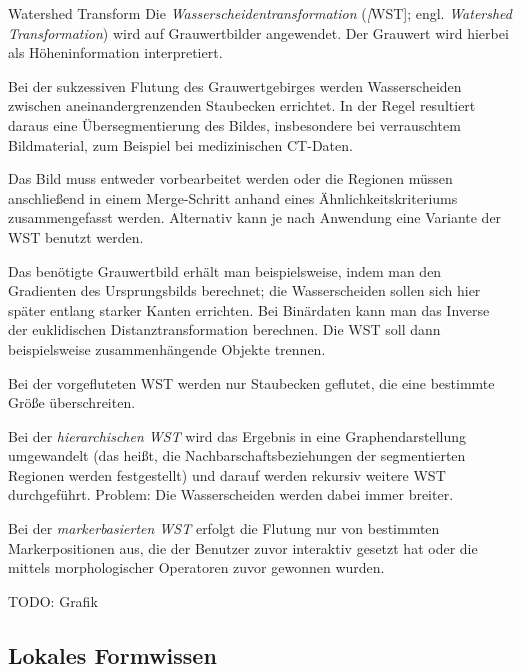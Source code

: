 \begin{defi}{Watershed Transform}
    Die \emph{Wasserscheidentransformation} (\emph[WST]; engl. \emph{Watershed Transformation}) wird auf Grauwertbilder angewendet.
    Der Grauwert wird hierbei als Höheninformation interpretiert.

    Bei der sukzessiven Flutung des Grauwertgebirges werden Wasserscheiden zwischen aneinandergrenzenden Staubecken errichtet.
    In der Regel resultiert daraus eine Übersegmentierung des Bildes, insbesondere bei verrauschtem Bildmaterial, zum Beispiel bei medizinischen CT-Daten.

    Das Bild muss entweder vorbearbeitet werden oder die Regionen müssen anschließend in einem Merge-Schritt anhand eines Ähnlichkeitskriteriums zusammengefasst werden.
    Alternativ kann je nach Anwendung eine Variante der WST benutzt werden.

    Das benötigte Grauwertbild erhält man beispielsweise, indem man den Gradienten des Ursprungsbilds berechnet; die Wasserscheiden sollen sich hier später entlang starker Kanten errichten. Bei Binärdaten kann man das Inverse der euklidischen Distanztransformation berechnen.
    Die WST soll dann beispielsweise zusammenhängende Objekte trennen.

    Bei der vorgefluteten WST werden nur Staubecken geflutet, die eine bestimmte Größe überschreiten.

    Bei der \emph{hierarchischen WST} wird das Ergebnis in eine Graphendarstellung umgewandelt (das heißt, die Nachbarschaftsbeziehungen der segmentierten Regionen werden festgestellt) und darauf werden rekursiv weitere WST durchgeführt.
    Problem: Die Wasserscheiden werden dabei immer breiter.

    Bei der \emph{markerbasierten WST} erfolgt die Flutung nur von bestimmten Markerpositionen aus, die der Benutzer zuvor interaktiv gesetzt hat oder die mittels morphologischer Operatoren zuvor gewonnen wurden.

    TODO: Grafik
\end{defi}

\subsection{Lokales Formwissen}

